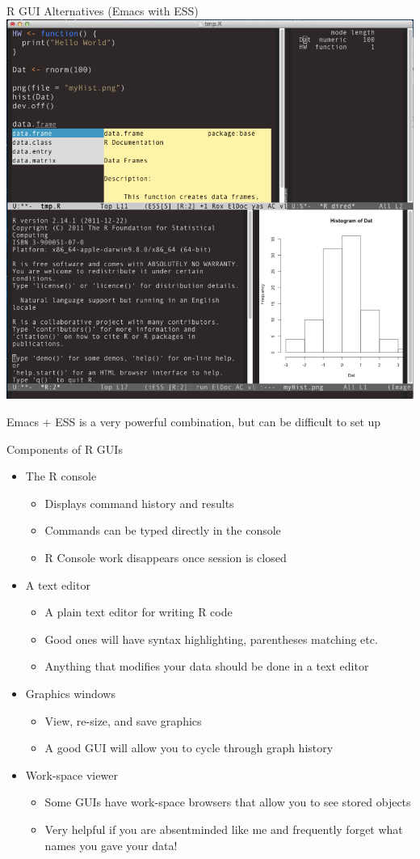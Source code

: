 \documentclass[table,smaller]{beamer}
\begin{document}
\begin{frame}[label=sec-2-4]{R GUI Alternatives (Emacs with ESS)}
\includegraphics[width=.65\textwidth]{images/emacs.png}

Emacs + ESS is a very powerful combination, but can be difficult to set up
\end{frame}


\begin{frame}[label=sec-2-5]{Components of R GUIs}
\begin{itemize}
\item The R console
\begin{itemize}
\item Displays command history and results
\item Commands can be typed directly in the console
\item R Console work disappears once session is closed
\end{itemize}

\item A text editor
\begin{itemize}
\item A plain text editor for writing R code
\item Good ones will have syntax highlighting, parentheses matching etc.
\item Anything that modifies your data should be done in a text editor
\end{itemize}

\item Graphics windows
\begin{itemize}
\item View, re-size, and save graphics
\item A good GUI will allow you to cycle through graph history
\end{itemize}

\item Work-space viewer
\begin{itemize}
\item Some GUIs have work-space browsers that allow you to see stored objects
\item Very helpful if you are absentminded like me and frequently forget what names you gave your data!
\end{itemize}
\end{itemize}
\end{frame}
\end{document}
